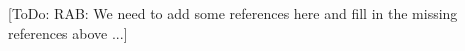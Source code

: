 \documentclass[pdf,ps2pdf,11pt]{SANDreport}
\begin{document}
[ToDo: RAB: We need to add some references here and fill in the missing
references above ...]


%
\clearpage



%
%

\end{document}

